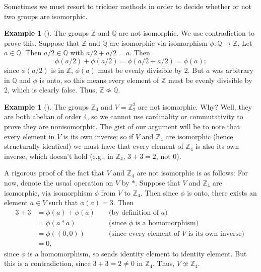 \documentclass[10pt,]{book}
\theoremstyle{plain}
\theoremstyle{definition}
\theoremstyle{definition}
\theoremstyle{definition}
\newtheorem{example}[theorem]{Example}
\theoremstyle{definition}
\numberwithin{equation}{section}
\def\Z{\mathbb{Z}}
\def\Q{\mathbb{Q}}
\newcommand{\amp}{&}
\begin{document}
Sometimes we must resort to trickier methods in order to decide whether or not two groups are isomorphic.%
\begin{example}[]\label{zq}
The groups \(\Z\) and \(\Q\) are not isomorphic. We use contradiction to prove this. Suppose that \(\Z\) and \(\Q\) are isomorphic via isomorphism \(\phi :\Q \to \Z\). Let \(a\in \Q\). Then \(a/2 \in \Q\) with \(a/2 + a/2 =a\). Then%
\begin{equation*}
\phi(a/2)+\phi(a/2)=
\phi(a/2+a/2)=\phi(a);
\end{equation*}
since \(\phi(a/2)\) is in \(\Z\), \(\phi(a)\) must be evenly divisible by 2. But \(a\) was arbitrary in \(\Q\) and \(\phi\) is onto, so this means every element of \(\Z\) must be evenly divisible by 2, which is clearly false. Thus, \(\Z\not\simeq \Q\).%
\end{example}
\begin{example}[]\label{x4nonunique}
The groups \(\Z_4\) and \(V=\Z_2^2\) are not isomorphic. Why? Well, they are both abelian of order 4, so we cannot use cardinality or commutativity to prove they are nonisomorphic. The gist of our argument will be to note that every element in \(V\) is its own inverse; so if \(V\) and \(\Z_4\) are isomorphic (hence structurally identical) we must have that every element of \(\Z_4\) is also its own inverse, which doesn't hold (e.g., in \(\Z_4\), \(3+3=2\), not \(0\)).%
\par
A rigorous proof of the fact that \(V\) and \(\Z_4\) are not isomorphic is as follows: For now, denote the usual operation on \(V\) by \(*\). Suppose that \(V\) and \(\Z_4\) are isomorphic, via isomorphism \(\phi\) from \(V\) to \(\Z_4\). Then since \(\phi\) is onto, there exists an element \(a\in V\) such that \(\phi(a)=3\). Then%
\begin{align*}
3+3\amp =\phi(a)+\phi(a)\amp \amp \text{ (by definition of \(a\)) }\\
\amp =\phi(a*a) \amp \amp \text{ (since \(\phi\) is a homomorphism) }\\
\amp =\phi((0,0)) \amp \amp \text{ (since every element of \(V\) is its own inverse) }\\
\amp =0, \amp \amp
\end{align*}
since \(\phi\) is a homomorphism, so sends identity element to identity element. But this is a contradiction, since \(3+3=2\neq 0\) in \(\Z_4\). Thus, \(V\not\simeq \Z_4\).%
\end{example}
\typeout{************************************************}
\typeout{************************************************}
\end{document}

